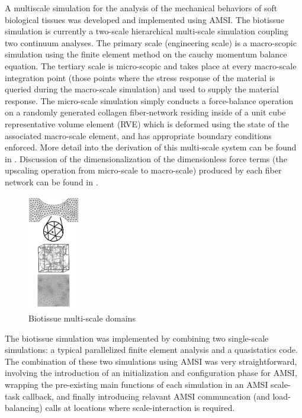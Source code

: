 A multiscale simulation for the analysis of the mechanical behaviors of soft biological tissues was developed and implemented using AMSI. The biotissue simulation is currently a two-scale hierarchical multi-scale simulation coupling two continuum analyses. The primary scale (engineering scale) is a macro-scopic simulation using the finite element method on the cauchy momentum balance equation. The tertiary scale is micro-scopic and takes place at every macro-scale integration point (those points where the stress response of the material is queried during the macro-scale simulation) and used to supply the material response. The micro-scale simulation simply conducts a force-balance operation on a randomly generated collagen fiber-network residing inside of a unit cube representative volume element (RVE) which is deformed using the state of the associated macro-scale element, and has appropriate boundary conditions enforced. More detail into the derivation of this multi-scale system can be found in \cite{stylianopoulos2008thesis} \cite{agoram2001coupled} \cite{stylianopoulos2007multiscale} . Discussion of the dimensionalization of the dimensionless force terms (the upscaling operation from micro-scale to macro-scale) produced by each fiber network can be found in \cite{stylianopoulos2007volume} \cite{chandran2007deterministic}.

\begin{figure}
  \begin{center}
    \includegraphics[height=2in]{biotissue-scales.png}
  \end{center}
  \caption{\small Biotissue multi-scale domains}
  \label{biotissue_scales}
\end{figure}

The biotissue simulation was implemented by combining two single-scale simulations: a typical parallelized finite element analysis and a quasistatics code. The combination of these two simulations using AMSI was very straightforward, involving the introduction of an initialization and configuration phase for AMSI, wrapping the pre-existing main functions of each simulation in an AMSI scale-task callback, and finally introducing relavant AMSI communcation (and load-balancing) calls at locations where scale-interaction is required. 

